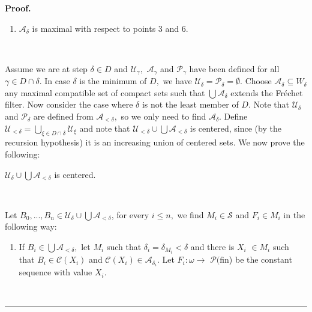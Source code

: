 \documentclass[10pt,a4paper]{amsart}
\newenvironment{proof}[1][Proof]{\noindent\textbf{#1.} }{\ \rule{0.5em}{0.5em}}
\begin{document}
\begin{proof}
\begin{enumerate}
\item $\mathcal{A}_{\delta}$ is maximal with respect to points 3 and 6.
\end{enumerate}

\qquad\ \ \ \ \qquad\ \ \ 

Assume we are at step $\delta\in D$ and $\mathcal{U}_{\gamma},$ $\mathcal{A}%
_{\gamma}$ and $\mathcal{P}_{\gamma}$ have been defined for all $\gamma\in
D\cap\delta.$ In case $\delta$ is the minimum of $D,$ we have $\mathcal{U}%
_{\delta}=\mathcal{P}_{\delta}=\emptyset.$ Choose $\mathcal{A}_{\delta
}\subseteq W_{\delta}$ any maximal compatible set of compact sets such that $%
{\textstyle\bigcup}
\mathcal{A}_{\delta}$ extends the Fr\'{e}chet filter. Now consider the case
where $\delta$ is not the least member of $D.$ Note that $\mathcal{U}_{\delta
}$ and $\mathcal{P}_{\delta}$ are defined from $\mathcal{A}_{<\delta},$ so we
only need to find $\mathcal{A}_{\delta}.$ Define $\mathcal{U}_{<\delta}=%
{\textstyle\bigcup\limits_{\xi\in D\cap\delta}}
\mathcal{U}_{\xi}$ and note that $\mathcal{U}_{<\delta}\cup%
{\textstyle\bigcup}
\mathcal{A}_{<\delta}$ is centered, since (by the recursion hypothesis) it is
an increasing union of centered sets. We now prove the following:

\begin{claim}
$\mathcal{U}_{\delta}\cup%
{\textstyle\bigcup}
\mathcal{A}_{<\delta}$ is centered.
\end{claim}

\qquad\ \ \ 

Let $B_{0},...,B_{n}\in\mathcal{U}_{\delta}\cup%
{\textstyle\bigcup}
\mathcal{A}_{<\delta}$, for every $i\leq n,$ we find $M_{i}\in\mathcal{S}$ and
$F_{i}\in M_{i}$ in the following way:

\begin{enumerate}
\item If $B_{i}\in%
{\textstyle\bigcup}
\mathcal{A}_{<\delta},$ let $M_{i}$ such that $\delta_{i}=\delta_{M_{i}%
}<\delta$ and there is $X_{i}$\textsf{ }$\in M_{i}$ such that $B_{i}%
\in\mathcal{C}\left(  X_{i}\right)  $ and $\mathcal{C}\left(  X_{i}\right)
\in\mathcal{A}_{\delta_{i}}.$ Let $F_{i}:\omega\longrightarrow$ $\mathcal{P(}%
$\textsf{fin)} be the constant sequence with value $X_{i}.$


\end{enumerate}
\end{proof}
\end{document}
